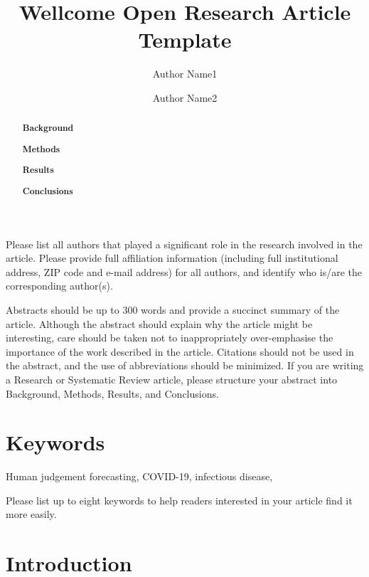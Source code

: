 \documentclass[10pt,a4paper,twocolumn]{article}
\begin{document}
\title{Wellcome Open Research Article Template}
\author[1]{Author Name1}
\author[2]{Author Name2}

\maketitle
\thispagestyle{fancy}

Please list all authors that played a significant role in the research involved in the article. Please provide full affiliation information (including full institutional address, ZIP code and e-mail address) for all authors, and identify who is/are the corresponding author(s).

Abstracts should be up to 300 words and provide a succinct summary of the article. Although the abstract should explain why the article might be interesting, care should be taken not to inappropriately over-emphasise the importance of the work described in the article. Citations should not be used in the abstract, and the use of abbreviations should be minimized. If you are writing a Research or Systematic Review article, please structure your abstract into Background, Methods, Results, and Conclusions.

\begin{abstract}

\textbf{Background}

\textbf{Methods}

\textbf{Results}

\textbf{Conclusions}



\end{abstract}

\section*{Keywords}

Human judgement forecasting, COVID-19, infectious disease, 

Please list up to eight keywords to help readers interested in your article find it more easily.


\clearpage

\section*{Introduction}
\end{document}
